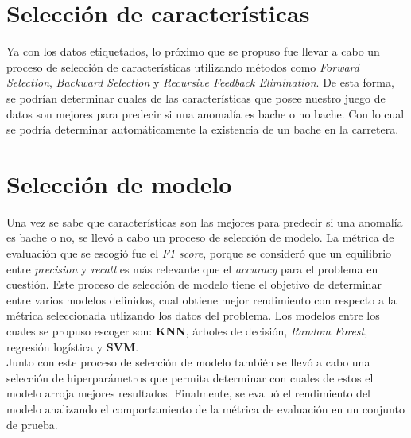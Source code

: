 \section{Selección de características}
	Ya con los datos etiquetados, lo próximo que se propuso fue llevar a cabo un proceso de selección de características utilizando métodos como
	\emph{Forward Selection}, \emph{Backward Selection} y \emph{Recursive Feedback Elimination}. De esta forma, se podrían determinar cuales de las 
	características que posee nuestro juego de datos son mejores para predecir si una anomalía es bache o no bache. Con lo cual se podría determinar
	automáticamente la existencia de un bache en la carretera.

\section{Selección de modelo}
	Una vez se sabe que características son las mejores para predecir si una anomalía es bache o no, se llevó a cabo un proceso de selección de
	modelo. La métrica de evaluación que se escogió fue el \emph{F1 score}, porque se consideró que un equilibrio entre \emph{precision} y
	\emph{recall} es más relevante que el \emph{accuracy} para el problema en cuestión. Este proceso de selección de modelo tiene el
	objetivo de determinar entre varios modelos definidos, cual obtiene mejor rendimiento con respecto a la métrica seleccionada utlizando los datos
	del problema. Los modelos entre los cuales se propuso escoger son: \textbf{KNN}, árboles de decisión, \emph{Random Forest}, regresión logística y
	\textbf{SVM}.\\
	\indent Junto con este proceso de selección de modelo también se llevó a cabo una selección de hiperparámetros que permita determinar con
	cuales de estos el modelo arroja mejores resultados. Finalmente, se evaluó el rendimiento del modelo analizando el comportamiento de la métrica
	de evaluación en un conjunto de prueba.
